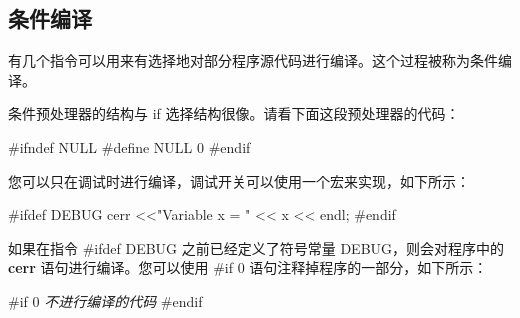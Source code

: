 \documentclass[
]{article}
\newenvironment{Shaded}{}{}
\newcommand{\CommentTok}[1]{\textcolor[rgb]{0.38,0.63,0.69}{\textit{#1}}}
\newcommand{\ControlFlowTok}[1]{\textcolor[rgb]{0.00,0.44,0.13}{\textbf{#1}}}
\newcommand{\DataTypeTok}[1]{\textcolor[rgb]{0.56,0.13,0.00}{#1}}
\newcommand{\DecValTok}[1]{\textcolor[rgb]{0.25,0.63,0.44}{#1}}
\newcommand{\ErrorTok}[1]{\textcolor[rgb]{1.00,0.00,0.00}{\textbf{#1}}}
\newcommand{\FloatTok}[1]{\textcolor[rgb]{0.25,0.63,0.44}{#1}}
\newcommand{\NormalTok}[1]{#1}
\newcommand{\OperatorTok}[1]{\textcolor[rgb]{0.40,0.40,0.40}{#1}}
\newcommand{\PreprocessorTok}[1]{\textcolor[rgb]{0.74,0.48,0.00}{#1}}
\newcommand{\StringTok}[1]{\textcolor[rgb]{0.25,0.44,0.63}{#1}}
\begin{document}
\begin{Shaded}
\end{Shaded}

\hypertarget{ux6761ux4ef6ux7f16ux8bd1}{%
\subsection{条件编译}\label{ux6761ux4ef6ux7f16ux8bd1}}

有几个指令可以用来有选择地对部分程序源代码进行编译。这个过程被称为条件编译。

条件预处理器的结构与 if 选择结构很像。请看下面这段预处理器的代码：

\begin{Shaded}
\begin{Highlighting}[]
\PreprocessorTok{\#ifndef NULL   }
   \PreprocessorTok{\#define NULL }\DecValTok{0}
\PreprocessorTok{\#endif}
\end{Highlighting}
\end{Shaded}

您可以只在调试时进行编译，调试开关可以使用一个宏来实现，如下所示：

\begin{Shaded}
\begin{Highlighting}[]
\PreprocessorTok{\#ifdef DEBUG   }
\NormalTok{   cerr }\OperatorTok{\textless{}\textless{}}\StringTok{"Variable x = "} \OperatorTok{\textless{}\textless{}}\NormalTok{ x }\OperatorTok{\textless{}\textless{}}\NormalTok{ endl}\OperatorTok{;}
\PreprocessorTok{\#endif}
\end{Highlighting}
\end{Shaded}

如果在指令 \#ifdef DEBUG 之前已经定义了符号常量 DEBUG，则会对程序中的
\textbf{cerr} 语句进行编译。您可以使用 \#if 0
语句注释掉程序的一部分，如下所示：

\begin{Shaded}
\begin{Highlighting}[]
\PreprocessorTok{\#if 0   }
\CommentTok{   不进行编译的代码}
\PreprocessorTok{\#endif}
\end{Highlighting}
\end{Shaded}
\end{document}
